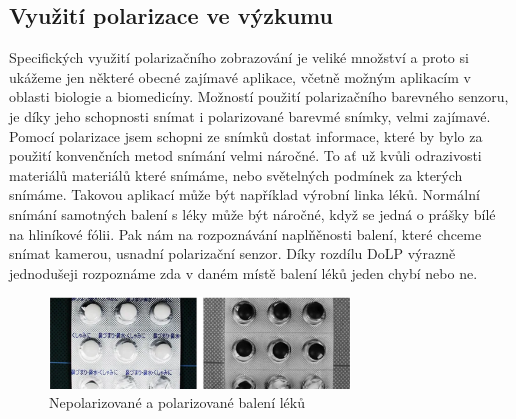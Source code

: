 \documentclass[a4paper]{article}
\numberwithin{equation}{section}
\begin{document}
    \subsection{Využití polarizace ve výzkumu}
    Specifických využití polarizačního zobrazování je veliké množství a proto si ukážeme jen některé obecné zajímavé aplikace, včetně možným aplikacím v oblasti biologie a biomedicíny. Možností použití polarizačního barevného senzoru, je díky jeho schopnosti snímat i polarizované barevmé snímky, velmi zajímavé. Pomocí polarizace jsem schopni ze snímků dostat informace, které by bylo za použití konvenčních metod snímání velmi náročné. To ať už kvůli odrazivosti materiálů materiálů které snímáme, nebo světelných podmínek za kterých snímáme. Takovou aplikací může být například výrobní linka léků. Normální snímání samotných balení s léky může být náročné, když se jedná o prášky bílé na hliníkové fólii. Pak nám na rozpoznávání naplňěnosti balení, které chceme snímat kamerou, usnadní polarizační senzor. Díky rozdílu DoLP výrazně jednodušeji rozpoznáme zda v daném místě balení léků jeden chybí nebo ne.\footnotemark[1]

    \begin{figure}[h]
        \centering
        \includegraphics[width=8cm]{figures/pills.png}
        \caption*{Nepolarizované a polarizované balení léků}
    \end{figure}
\end{document}
